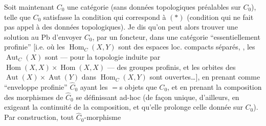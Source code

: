 Soit maintenant $C_0$ une catégorie (sans
données topologiques préalables sur $C_0$),
telle que $C_0$ satisfasse la condition
qui correspond à $(*)$ (condition qui ne
fait pas appel à des données topologiques).
Je dis qu'on peut alors trouver une
solution au Pb d'envoyer $C_0$, par un foncteur,
dans une catégorie  ``essentiellement profinie''
[i.e. où les $\operatorname{Hom}_C(X,Y)$ sont des espaces loc. compacts
séparés, , les $\operatorname{Aut}_C(X)$ sont --- pour la topologie
induite par $\operatorname{Hom}(X,X)\times\operatorname{Hom}(X,X)$ --- des
groupes profinis, et les orbites des $\operatorname{Aut}(X)\times\operatorname{Aut}(Y)$
dans $\operatorname{Hom}_C(X,Y)$ sont ouvertes\ldots], en prenant
comme ``enveloppe profinie'' $\widehat C_0$  ayant les
$=$s  objets que $C_0$, et en prenant
la composition des morphismes de $\widehat C_0$ se
définissant ad-hoc (de façon unique, d'ailleurs,
en exigeant la continuité de la composition, et
qu'elle prolonge celle donnée sur $C_0$).
Par construction, tout $\widehat C_0$-morphisme
